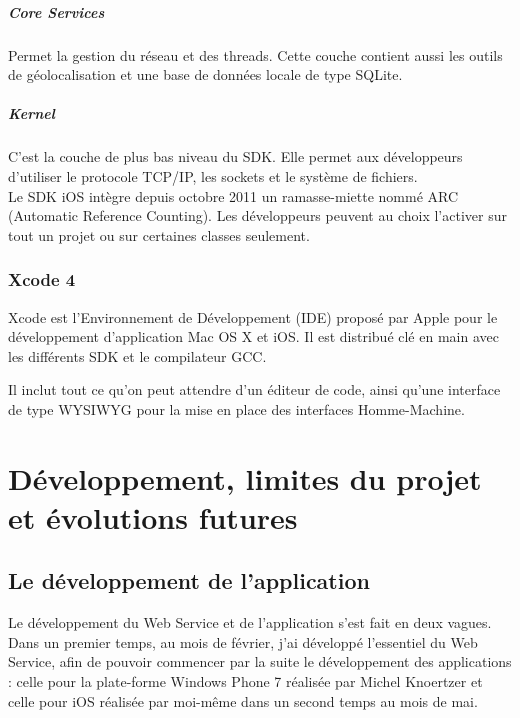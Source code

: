 \documentclass[11pt, french]{report}
\begin{document}
\paragraph{Core Services} Permet la gestion du réseau et des threads. Cette couche contient aussi les outils de géolocalisation et une base de données locale de type SQLite.

\paragraph{Kernel} C'est la couche de plus bas niveau du SDK. Elle permet aux développeurs d'utiliser le protocole TCP/IP, les  sockets et le système de fichiers.\\

Le SDK iOS intègre depuis octobre 2011 un ramasse-miette nommé ARC (Automatic Reference Counting). Les développeurs peuvent au choix l'activer sur tout un projet ou sur certaines classes seulement.

\subsection{Xcode 4}

Xcode est l'Environnement de Développement (IDE) proposé par Apple pour le développement d'application Mac OS X et iOS. Il est distribué clé en main avec les différents SDK et le compilateur GCC.

Il inclut tout ce qu'on peut attendre d'un éditeur de code, ainsi qu'une interface de type WYSIWYG pour la mise en place des interfaces Homme-Machine.



\chapter{Développement, limites du projet et évolutions futures}

\section{Le développement de l’application}

Le développement du Web Service et de l'application s'est fait en deux vagues. Dans un premier temps, au mois de février, j'ai développé l'essentiel du Web Service, afin de pouvoir commencer par la suite le développement des applications : celle pour la plate-forme Windows Phone 7 réalisée par Michel Knoertzer et celle pour iOS réalisée par moi-même dans un second temps au mois de mai.
\end{document}
